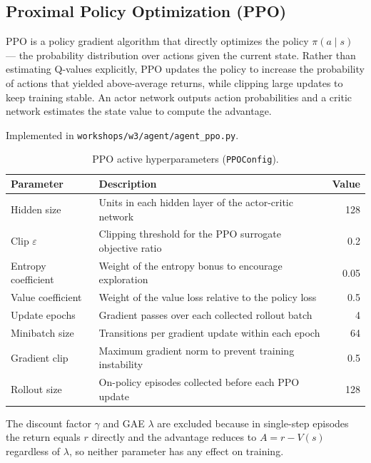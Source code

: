 \documentclass{article}
\begin{document}
\subsection{Proximal Policy Optimization (PPO)}

PPO is a policy gradient algorithm that directly optimizes the policy $\pi(a \mid s)$
— the probability distribution over actions given the current state. Rather than
estimating Q-values explicitly, PPO updates the policy to increase the probability of
actions that yielded above-average returns, while clipping large updates to keep
training stable. An actor network outputs action probabilities and a critic network
estimates the state value to compute the advantage.

Implemented in \texttt{workshops/w3/agent/agent\_ppo.py}.

\begin{table}[H]
\centering
\caption{PPO active hyperparameters (\texttt{PPOConfig}).}
\begin{tabular}{lp{7.5cm}r}
\toprule
\textbf{Parameter} & \textbf{Description} & \textbf{Value} \\
\midrule
Hidden size          & Units in each hidden layer of the actor-critic network & 128 \\
Clip $\varepsilon$   & Clipping threshold for the PPO surrogate objective ratio & 0.2 \\
Entropy coefficient  & Weight of the entropy bonus to encourage exploration & 0.05 \\
Value coefficient    & Weight of the value loss relative to the policy loss & 0.5 \\
Update epochs        & Gradient passes over each collected rollout batch & 4 \\
Minibatch size       & Transitions per gradient update within each epoch & 64 \\
Gradient clip        & Maximum gradient norm to prevent training instability & 0.5 \\
Rollout size         & On-policy episodes collected before each PPO update & 128 \\
\bottomrule
\end{tabular}
\end{table}

The discount factor $\gamma$ and GAE $\lambda$ are excluded because in single-step episodes
the return equals $r$ directly and the advantage reduces to $A = r - V(s)$ regardless of
$\lambda$, so neither parameter has any effect on training.
\end{document}
